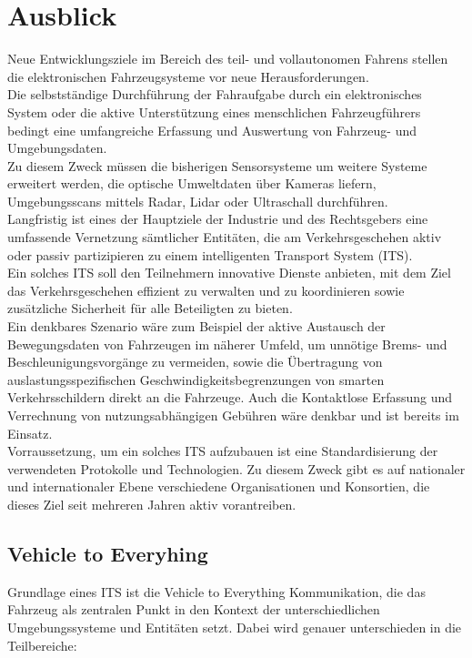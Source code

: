 \section{Ausblick}

    Neue Entwicklungsziele im Bereich des teil- und vollautonomen Fahrens stellen die elektronischen Fahrzeugsysteme vor neue Herausforderungen.\\
    Die selbstständige Durchführung der Fahraufgabe durch ein elektronisches System oder die aktive Unterstützung eines menschlichen Fahrzeugführers
    bedingt eine umfangreiche Erfassung und Auswertung von Fahrzeug- und Umgebungsdaten.\\
    Zu diesem Zweck müssen die bisherigen Sensorsysteme um weitere Systeme erweitert werden, die optische Umweltdaten über Kameras liefern, Umgebungsscans
    mittels Radar, Lidar oder Ultraschall durchführen. ~\cite{.BP06}\\

    Langfristig ist eines der Hauptziele der Industrie und des Rechtsgebers eine umfassende Vernetzung
    sämtlicher Entitäten, die am Verkehrsgeschehen aktiv oder passiv partizipieren zu einem intelligenten
    Transport System (ITS).\\
    Ein solches ITS soll den Teilnehmern innovative Dienste anbieten, mit dem Ziel das Verkehrsgeschehen
    effizient zu verwalten und zu koordinieren sowie zusätzliche Sicherheit für alle Beteiligten zu bieten. ~\cite{.BP04}\\

    Ein denkbares Szenario wäre zum Beispiel der aktive Austausch der Bewegungsdaten von Fahrzeugen im näherer Umfeld, um unnötige Brems-
    und Beschleunigungsvorgänge zu vermeiden, sowie die Übertragung von auslastungsspezifischen Geschwindigkeitsbegrenzungen von smarten Verkehrsschildern
    direkt an die Fahrzeuge. Auch die Kontaktlose Erfassung und Verrechnung von nutzungsabhängigen Gebühren wäre denkbar und ist bereits im Einsatz.\\

    Vorraussetzung, um ein solches ITS aufzubauen ist eine Standardisierung der verwendeten Protokolle und Technologien.
    Zu diesem Zweck gibt es auf nationaler und internationaler Ebene verschiedene Organisationen und Konsortien,
    die dieses Ziel seit mehreren Jahren aktiv vorantreiben.\\

    \subsection{Vehicle to Everyhing}
    Grundlage eines ITS ist die Vehicle to Everything Kommunikation, die das Fahrzeug als zentralen Punkt in den
    Kontext der unterschiedlichen Umgebungssysteme und Entitäten setzt. Dabei wird genauer unterschieden in die Teilbereiche:
    
